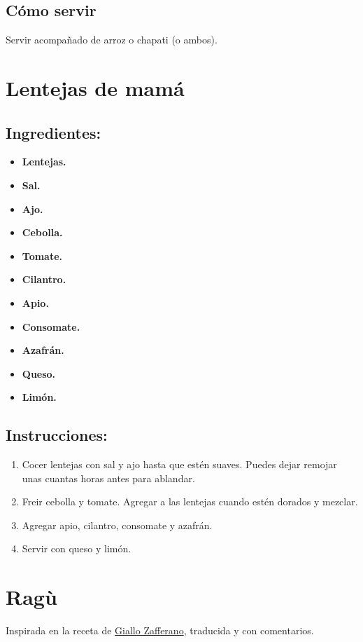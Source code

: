 \documentclass{book}
\begin{document}
\subsection*{Cómo servir}
Servir acompañado de arroz o chapati (o ambos).

\newpage
\section{Lentejas de mamá}
\subsection*{Ingredientes:}
\begin{itemize}
	\item \textbf{Lentejas.}
	\item \textbf{Sal.}
	\item \textbf{Ajo.}
	\item \textbf{Cebolla.}
	\item \textbf{Tomate.}
	\item \textbf{Cilantro.}
	\item \textbf{Apio.}
	\item \textbf{Consomate.}
	\item \textbf{Azafrán.}
	\item \textbf{Queso.}
	\item \textbf{Limón.}
\end{itemize}
\subsection*{Instrucciones:}
\begin{enumerate}
	\item Cocer lentejas con sal y ajo hasta que estén suaves.
		Puedes dejar remojar unas cuantas horas antes para ablandar.
	\item Freir cebolla y tomate.
		Agregar a las lentejas cuando estén dorados y mezclar.
	\item Agregar apio, cilantro, consomate y azafrán.
	\item Servir con queso y limón.
\end{enumerate}

\newpage
\section{Ragù}
Inspirada en la receta de
\href{https://ricette.giallozafferano.it/Ragu-alla-bolognese.html}{Giallo Zafferano},
traducida y con comentarios.
\end{document}
